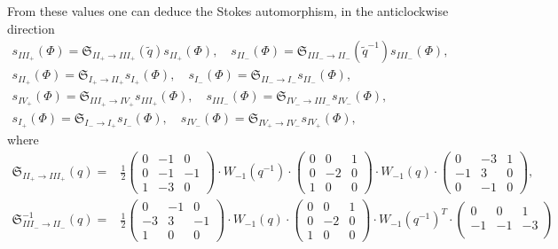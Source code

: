 \documentclass[12pt,reqno]{amsart}
\theoremstyle{definition}
\def\tq{\tilde{q}}
\def\mf{\mathfrak}
\newcommand{\nn}{\nonumber \\}
\begin{document}
From these values one can deduce the Stokes automorphism, in the
anticlockwise direction
\begin{gather}
  s_{III_+}(\Phi) = \mf{S}_{II_+\to III_+}(\tq) s_{II_+}(\Phi),\quad
  s_{II_-}(\Phi) = \mf{S}_{III_-\to II_-}(\tq^{-1}) s_{III_-}(\Phi),\nn
  s_{II_+}(\Phi) = \mf{S}_{I_+\to II_+} s_{I_+}(\Phi),\quad
  s_{I_-}(\Phi) = \mf{S}_{II_-\to I_-} s_{II_-}(\Phi),\nn
  s_{IV_+}(\Phi) = \mf{S}_{III_+\to IV_+} s_{III_+}(\Phi),\quad
  s_{III_-}(\Phi) = \mf{S}_{IV_-\to III_-} s_{IV_-}(\Phi),\nn
  s_{I_+}(\Phi) = \mf{S}_{I_-\to I_+} s_{I_-}(\Phi),\quad
  s_{IV_-}(\Phi) = \mf{S}_{IV_+\to IV_-} s_{IV_+}(\Phi),
\end{gather}
where
\begin{align}
  \mf{S}_{II_+\to III_+}(q) =
  &\frac{1}{2}
      \begin{pmatrix}
        0&-1&0\\
        0&-1&-1\\
        1&-3&0
      \end{pmatrix}\cdot W_{-1}(q^{-1})\cdot
               \begin{pmatrix}
                 0&0&1\\
                 0&-2&0\\
                 1&0&0
               \end{pmatrix}\cdot W_{-1}(q)\cdot
               \begin{pmatrix}
                 0&-3&1\\
                 -1&3&0\\
                 0&-1&0
               \end{pmatrix},\\
  \mf{S}^{-1}_{III_-\to II_-}(q) =
  &\frac{1}{2}
      \begin{pmatrix}
        0&-1&0\\
        -3&3&-1\\
        1&0&0
      \end{pmatrix}
              \cdot W_{-1}(q) \cdot
              \begin{pmatrix}
                 0&0&1\\
                 0&-2&0\\
                 1&0&0
               \end{pmatrix}\cdot W_{-1}(q^{-1})^T
                      \cdot
              \begin{pmatrix}
                0&0&1\\
                -1&-1&-3\\

\end{pmatrix}
\end{align}
\end{document}
